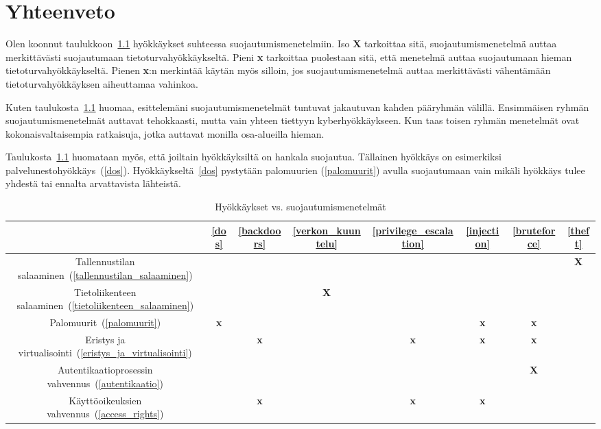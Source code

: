 \chapter{Yhteenveto}\label{yhteenveto}
Olen koonnut taulukkoon~\ref{tab:security-table} hyökkäykset suhteessa suojautumismenetelmiin. Iso \textbf{X} tarkoittaa sitä, suojautumismenetelmä auttaa merkittävästi suojautumaan tietoturvahyökkäykseltä. Pieni \textbf{x} tarkoittaa puolestaan sitä, että menetelmä auttaa suojautumaan hieman tietoturvahyökkäykseltä. Pienen \textbf{x}:n merkintää käytän myös silloin, jos suojautumismenetelmä auttaa merkittävästi vähentämään tietoturvahyökkäyksen aiheuttamaa vahinkoa.

Kuten taulukosta~\ref{tab:security-table} huomaa, esittelemäni suojautumismenetelmät tuntuvat jakautuvan kahden pääryhmän välillä. Ensimmäisen ryhmän suojautumismenetelmät auttavat tehokkaasti, mutta vain yhteen tiettyyn kyberhyökkäykseen. Kun taas toisen ryhmän menetelmät ovat kokonaisvaltaisempia ratkaisuja, jotka auttavat monilla osa-alueilla hieman.

Taulukosta~\ref{tab:security-table} huomataan myös, että joiltain hyökkäyksiltä on hankala suojautua. Tällainen hyökkäys on esimerkiksi palvelunestohyökkäys~(\ref{dos}). Hyökkäykseltä~\ref{dos} pystytään palomuurien (\ref{palomuurit}) avulla suojautumaan vain mikäli hyökkäys tulee yhdestä tai ennalta arvattavista lähteistä.

\begin{table}
\centering{}\caption{Hyökkäykset vs. suojautumismenetelmät\label{tab:security-table}}
\begin{tabular}{c|c|c|c|c|c|c|c|}
   &\ref{dos}&\ref{backdoors}&\ref{verkon_kuuntelu}&\ref{privilege_escalation}&\ref{injection}&\ref{bruteforce}&\ref{theft} \tabularnewline\hline
    Tallennustilan salaaminen~(\ref{tallennustilan_salaaminen}) & & & & & & & \textbf{X}\tabularnewline\hline
    Tietoliikenteen salaaminen~(\ref{tietoliikenteen_salaaminen}) & & & \textbf{X} & & & &\tabularnewline\hline
    Palomuurit~(\ref{palomuurit}) & \textbf{x} & & & & \textbf{x} & \textbf{x} &\tabularnewline\hline
    Eristys ja virtualisointi~(\ref{eristys_ja_virtualisointi}) & & \textbf{x} & & \textbf{x} & \textbf{x} & \textbf{x} &\tabularnewline\hline
    Autentikaatioprosessin vahvennus~(\ref{autentikaatio}) & & & & & & \textbf{X} &\tabularnewline\hline
    Käyttöoikeuksien vahvennus~(\ref{access_rights}) & & \textbf{x} & & \textbf{x} & \textbf{x} & &\tabularnewline\hline
\end{tabular}
\end{table}
